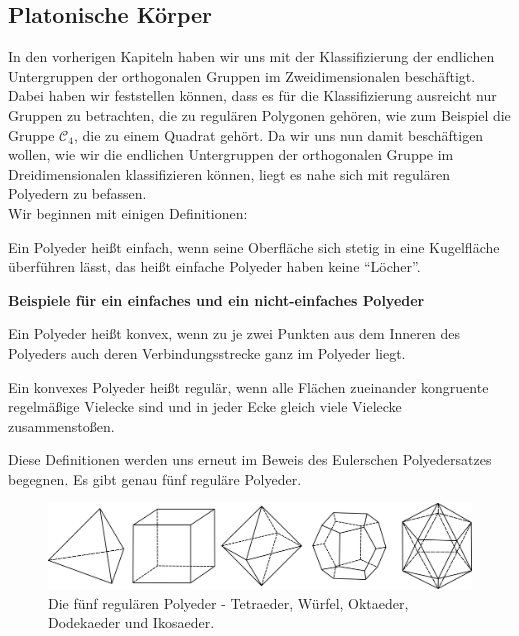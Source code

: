 \subsection{Platonische Körper}
In den vorherigen Kapiteln haben wir uns mit der Klassifizierung der endlichen Untergruppen der orthogonalen Gruppen im Zweidimensionalen beschäftigt. Dabei haben wir feststellen können, dass es für die Klassifizierung ausreicht nur Gruppen zu betrachten, die zu regulären Polygonen gehören, wie zum Beispiel die Gruppe $\mathcal{C}_4$, die zu einem Quadrat gehört. Da wir uns nun damit beschäftigen wollen, wie wir die endlichen Untergruppen der orthogonalen Gruppe im Dreidimensionalen klassifizieren können, liegt es nahe sich mit regulären Polyedern zu befassen.\\
Wir beginnen mit einigen Definitionen: 
\begin{defi}
	Ein Polyeder heißt einfach, wenn seine Oberfläche sich stetig in eine Kugelfläche überführen lässt, das heißt einfache Polyeder haben keine \enquote{Löcher}. \citep[211]{Mainzer1988}
\end{defi}
\textbf{Beispiele für ein einfaches und ein nicht-einfaches Polyeder}
\begin{defi}
	Ein Polyeder heißt konvex, wenn zu je zwei Punkten aus dem Inneren des Polyeders auch deren Verbindungsstrecke ganz im Polyeder liegt. \citep[51]{Mueller2012}
\end{defi}
\begin{defi}
	Ein konvexes Polyeder heißt regulär, wenn alle Flächen zueinander kongruente regelmäßige Vielecke sind und in jeder Ecke gleich viele Vielecke zusammenstoßen. \citep[51]{Mueller2012}
\end{defi}
Diese Definitionen werden uns erneut im Beweis des Eulerschen Polyedersatzes begegnen. Es gibt genau fünf reguläre Polyeder.\\
\begin{figure}[H]
    \centering
    \includegraphics[width=0.9\linewidth]{grafiken/platonische_koerper.pdf}
    \caption{Die fünf regulären Polyeder - Tetraeder, Würfel, Oktaeder, Dodekaeder und Ikosaeder.}
    \label{fig:grafiken/platonische_koerper}
\end{figure}
